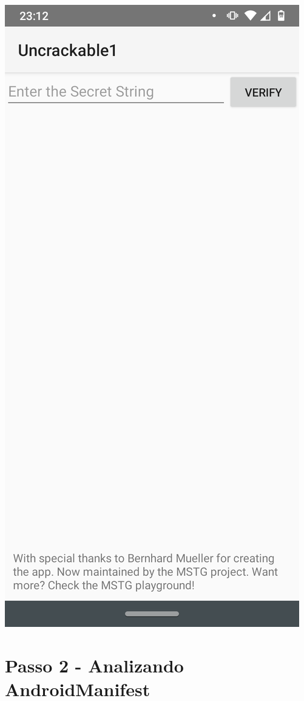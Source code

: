 \documentclass{article}
\begin{document}
\includegraphics[height=.5\textheight]{imports/uncrackable.png}

\newpage
\section*{Passo 2 - Analizando AndroidManifest}
\end{document}
